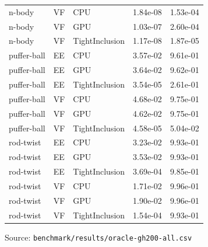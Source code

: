 \begin{table}[htbp]
{\begin{tabular}{lllrr}
    n-body & VF & CPU & 1.84e-08 & 1.53e-04 \\
    n-body & VF & GPU & 1.03e-07 & 2.60e-04 \\
    n-body & VF & TightInclusion & 1.17e-08 & 1.87e-05 \\
    puffer-ball & EE & CPU & 3.57e-02 & 9.61e-01 \\
    puffer-ball & EE & GPU & 3.64e-02 & 9.62e-01 \\
    puffer-ball & EE & TightInclusion & 3.54e-05 & 2.61e-01 \\
    puffer-ball & VF & CPU & 4.68e-02 & 9.75e-01 \\
    puffer-ball & VF & GPU & 4.62e-02 & 9.75e-01 \\
    puffer-ball & VF & TightInclusion & 4.58e-05 & 5.04e-02 \\
    rod-twist & EE & CPU & 3.23e-02 & 9.93e-01 \\
    rod-twist & EE & GPU & 3.53e-02 & 9.93e-01 \\
    rod-twist & EE & TightInclusion & 3.69e-04 & 9.85e-01 \\
    rod-twist & VF & CPU & 1.71e-02 & 9.96e-01 \\
    rod-twist & VF & GPU & 1.90e-02 & 9.96e-01 \\
    rod-twist & VF & TightInclusion & 1.54e-04 & 9.93e-01 \\
    \bottomrule
  \end{tabular}}
  \par\smallskip\footnotesize Source: \texttt{benchmark/results/oracle-gh200-all.csv}
\end{table}
